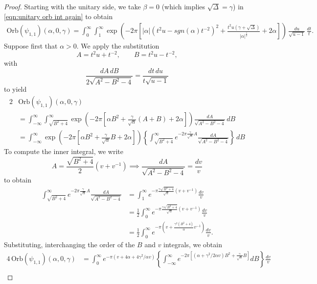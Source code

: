 \documentclass[reqno, 11pt]{amsart} %
\numberwithin{equation}{section}
\theoremstyle{plain}
\theoremstyle{definition}
\theoremstyle{remark}
\newcommand{\Orb}{\mathrm{Orb}}
\begin{document}
\begin{proof}
Starting with the unitary side, we take $\beta = 0$  (which implies $\sqrt{\Delta } = \gamma$) in \eqref{eqn:unitary orb int again} to obtain
\begin{align*}
  \Orb(\psi_{1,1})(\alpha,0,\gamma) = \int_0^{\infty} \int_{1}^{\infty} 		 \exp \left(-2\pi \left[ |\alpha| ( t^2  u - sgn(\alpha)t^{-2} )^2 + \frac{t^2u(\gamma+ \sqrt{\Delta})}{|\alpha|^\frac12}  + 2 \alpha \right] \right)  \,\frac{du}{\sqrt{u-1}}\, \frac{dt}t.
\end{align*}
Suppose first that $\alpha >0$. We apply the substitution
\[
A = t^2 u + t^{-2}, \qquad B = t^2u - t^{-2},
\]
with
\[
\frac{dA \, dB}{2\sqrt{A^2 - B^2 - 4} }  =\frac{dt\, du}{t\sqrt{u-1}}
\]
to yield
\begin{align*}
2 &\Orb(\psi_{1,1})(\alpha,0,\gamma)  \\ &= \int_{-\infty}^{\infty} \int_{\sqrt{B^2 + 4}}^{\infty} \exp\left( - 2 \pi \left[ \alpha  B^2 +  \frac{\gamma}{\sqrt \alpha } (A+B) + 2 \alpha \right] \right) \frac{dA}{\sqrt{A^2-B^2 - 4}} \, dB \\
&=  \int_{-\infty}^{\infty}    \exp\left( - 2 \pi \left[ \alpha  B^2 +  \frac{\gamma}{\sqrt \alpha } B + 2 \alpha \right] \right)
\left\{  \int_{\sqrt{B^2 + 4}}^{\infty}  e^{- 2 \pi \frac{\gamma}{\sqrt{\alpha} }A} \frac{dA}{\sqrt{A^2-B^2 - 4}}  \right\}  \, dB
\end{align*}
To compute the inner integral, we write
\[
A = \frac{\sqrt{B^2 + 4} }{2}(v + v^{-1}) \implies \frac{dA}{\sqrt{A^2 - B^2 - 4}} = \frac{dv}v
\]
to obtain
\begin{align*}
\int_{\sqrt{B^2 + 4}}^{\infty}  e^{- 2 \pi \frac{\gamma}{\sqrt{\alpha} }A} \frac{dA}{\sqrt{A^2-B^2 - 4}}   &= \int_1^{\infty}e^{- \pi \frac{\gamma \sqrt{B^2 + 4}}{\sqrt \alpha}(v + v^{-1}) } \frac{dv}{v} \\
&= \frac12 \int_0^{\infty}e^{- \pi \frac{\gamma \sqrt{B^2 + 4}}{\sqrt \alpha}(v + v^{-1}) } \frac{dv}{v} \\
&= \frac12 \int_0^{\infty} e^{-  \pi \left( v + \frac{\gamma^2(B^2 + 4)}{\alpha}v^{-1} \right) } \frac{dv}v.
\end{align*}
Substituting, interchanging the order of the $B$ and $v$ integrals, we obtain
\begin{align*}
4 \, \Orb(\psi_{1,1})(\alpha, 0, \gamma) &= \int_0^{\infty} e^{- \pi (v + 4\alpha + 4 \gamma^2/ \alpha v )}  \left\{   \int_{-\infty}^{\infty}e^{- 2 \pi \left[    \left(  \alpha + \gamma^2/2\alpha v \right) B^2 + \frac{\gamma}{\sqrt \alpha} B   \right] } dB \right\} \frac{dv}v \\

\end{align*}
\end{proof}
\end{document}
